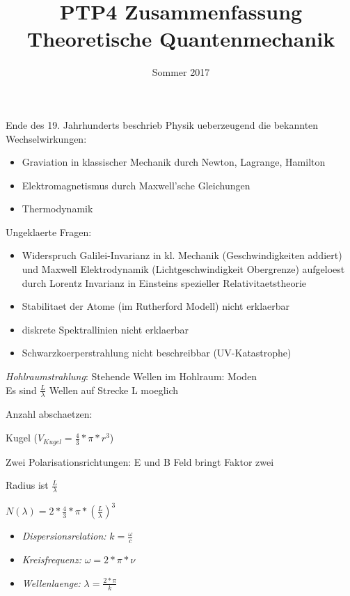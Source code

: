 \documentclass{article}
\begin{document}
\title{PTP4 Zusammenfassung \\ Theoretische Quantenmechanik}
\date{Sommer 2017}
\maketitle


Ende des 19. Jahrhunderts beschrieb Physik ueberzeugend die bekannten Wechselwirkungen:
\begin{itemize}
\item Graviation in klassischer Mechanik durch Newton, Lagrange, Hamilton
\item Elektromagnetismus durch Maxwell'sche Gleichungen
\item Thermodynamik
\end{itemize}

Ungeklaerte Fragen: 
\begin{itemize}
\item Widerspruch Galilei-Invarianz in kl. Mechanik (Geschwindigkeiten addiert) und Maxwell Elektrodynamik (Lichtgeschwindigkeit Obergrenze) aufgeloest durch Lorentz Invarianz in Einsteins spezieller Relativitaetstheorie
\item Stabilitaet der Atome (im Rutherford Modell) nicht erklaerbar
\item diskrete Spektrallinien nicht erklaerbar
\item Schwarzkoerperstrahlung nicht beschreibbar (UV-Katastrophe)
\end{itemize}

\emph{Hohlraumstrahlung}: 
Stehende Wellen im Hohlraum: Moden \\
Es sind $\frac{L}{\lambda}$ Wellen auf Strecke L moeglich


Anzahl abschaetzen:


Kugel ($V_{Kugel}=\frac{4}{3}*\pi*r^3$)


Zwei Polarisationsrichtungen: E und B Feld bringt Faktor zwei


Radius ist $\frac{L}{\lambda}$

$N(\lambda)  = 2*\frac{4}{3}*\pi*(\frac{L}{\lambda})^3$

\begin{itemize}
\item\emph{Dispersionsrelation:} $k = \frac{\omega}{c}$
\item\emph{Kreisfrequenz:} $\omega = 2*\pi*\nu$
\item\emph{Wellenlaenge:} $\lambda = \frac{2*\pi}{k}$
\end{itemize}
\end{document}
